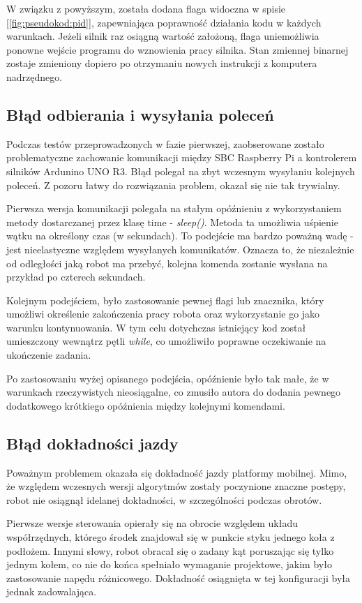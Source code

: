 W związku z powyższym, została dodana flaga widoczna w spisie [\ref{fig:pseudokod:pid}], zapewniająca poprawność działania kodu w każdych warunkach. Jeżeli silnik raz osiągną wartość założoną, flaga uniemożliwia ponowne wejście programu do wznowienia pracy silnika. Stan zmiennej binarnej zostaje zmieniony dopiero po otrzymaniu nowych instrukcji z komputera nadrzędnego. 

\subsection{Błąd odbierania i wysyłania poleceń}
Podczas testów przeprowadzonych w fazie pierwszej, zaobserowane zostało problematyczne zachowanie komunikacji między SBC Raspberry Pi a kontrolerem silników Ardunino UNO R3. Błąd polegał na zbyt wczesnym wysyłaniu kolejnych poleceń. Z pozoru łatwy do rozwiązania problem, okazał się nie tak trywialny. 

Pierwsza wersja komunikacji polegała na stałym opóźnieniu z wykorzystaniem metody dostarczanej przez klasę time - \textit{sleep()}. Metoda ta umożliwia uśpienie wątku na określony czas (w sekundach). To podejście ma bardzo poważną wadę - jest nieelastyczne względem wysyłanych komunikatów. Oznacza to, że niezależnie od odległości jaką robot ma przebyć, kolejna komenda zostanie wysłana na przykład po czterech sekundach. 

Kolejnym podejściem, było zastosowanie pewnej flagi lub znacznika, który umożliwi określenie zakończenia pracy robota oraz wykorzystanie go jako warunku kontynuowania. W tym celu dotychczas istniejący kod został umieszczony wewnątrz pętli \textit{while}, co umożliwiło poprawne oczekiwanie na ukończenie zadania. 

Po zastosowaniu wyżej opisanego podejścia, opóźnienie było tak małe, że w warunkach rzeczywistych nieosiągalne, co zmusiło autora do dodania pewnego dodatkowego krótkiego opóźnienia między kolejnymi komendami. 

\subsection{Błąd dokładności jazdy}

Poważnym problemem okazała się dokładność jazdy platformy mobilnej. Mimo, że względem wczesnych wersji algorytmów zostały poczynione znaczne postępy, robot nie osiągnął idelanej dokładności, w szczególności podczas obrotów. 

Pierwsze wersje sterowania opierały się na obrocie względem układu współrzędnych, którego środek znajdował się w punkcie styku jednego koła z podłożem. Innymi słowy, robot obracał się o zadany kąt poruszając się tylko jednym kołem, co nie do końca spełniało wymaganie projektowe, jakim było zastosowanie napędu różnicowego. Dokładność osiągnięta w tej konfiguracji była jednak zadowalająca. 


